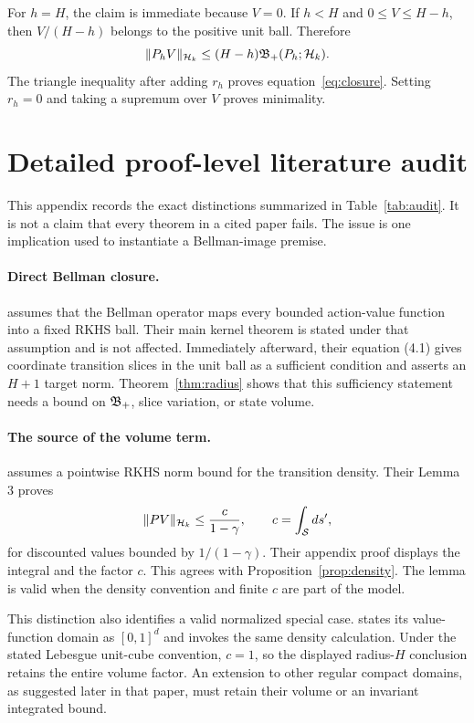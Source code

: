 For $h=H$, the claim is immediate because $V=0$. If $h<H$ and
$0\leq V\leq H-h$, then $V/(H-h)$ belongs to the positive unit ball. Therefore
\begin{equation}
 \|P_hV\|_{\mathcal H_k}\leq(H-h)\mathfrak B_{+}(P_h;\mathcal H_k).
\end{equation}
The triangle inequality after adding $r_h$ proves
equation~\eqref{eq:closure}. Setting $r_h=0$ and taking a supremum over $V$ proves
minimality.

\section{Detailed proof-level literature audit}
\label{app:audit}

This appendix records the exact distinctions summarized in
Table~\ref{tab:audit}. It is not a claim that every theorem in a cited paper fails.
The issue is one implication used to instantiate a Bellman-image premise.

\paragraph{Direct Bellman closure.}
\citet[Assumption 4.1]{yang2020kernel} assumes that the Bellman operator maps every
bounded action-value function into a fixed RKHS ball. Their main kernel theorem is
stated under that assumption and is not affected. Immediately afterward, their
equation (4.1) gives coordinate transition slices in the unit ball as a sufficient
condition and asserts an $H+1$ target norm. Theorem~\ref{thm:radius} shows that this
sufficiency statement needs a bound on $\mathfrak B_{+}$, slice variation, or state volume.

\paragraph{The source of the volume term.}
\citet[Assumption 2]{yeh2023sample} assumes a pointwise RKHS norm bound for the
transition density. Their Lemma 3 proves
\begin{equation}
 \|PV\|_{\mathcal H_k}\leq\frac{c}{1-\gamma},
 \qquad c=\int_{\mathcal S}ds',
\end{equation}
for discounted values bounded by $1/(1-\gamma)$. Their appendix proof displays the
integral and the factor $c$. This agrees with Proposition~\ref{prop:density}. The
lemma is valid when the density convention and finite $c$ are part of the model.

This distinction also identifies a valid normalized special case.
\citet[Lemma 2.3]{vakili2024rewardfree} states its value-function domain as
$[0,1]^d$ and invokes the same density calculation. Under the stated Lebesgue
unit-cube convention, $c=1$, so the displayed radius-$H$ conclusion retains the
entire volume factor. An extension to other regular compact domains, as suggested
later in that paper, must retain their volume or an invariant integrated bound.


